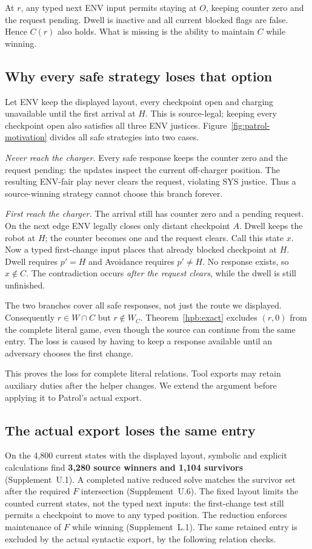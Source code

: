 At $r$, any typed next ENV input permits staying at $O$, keeping counter zero
and the request pending. Dwell is inactive and all current blocked flags are
false. Hence $C(r)$ also holds. What is missing is the ability to maintain
$C$ while winning.

\subsection{Why every safe strategy loses that option}
Let ENV keep the displayed layout, every checkpoint open and charging
unavailable until the first arrival at $H$. This is source-legal; keeping every checkpoint open also satisfies all
three ENV justices. Figure~\ref{fig:patrol-motivation} divides all safe
strategies into two cases.

\emph{Never reach the charger.} Every safe response keeps the counter zero
and the request pending: the updates inspect the current off-charger position.
The resulting ENV-fair play never clears the request, violating SYS justice.
Thus a source-winning strategy cannot choose this branch forever.

\emph{First reach the charger.} The arrival still has counter zero and a
pending request. On the next edge ENV legally closes only distant checkpoint
$A$. Dwell keeps the robot at $H$; the counter becomes one and the request
clears. Call this state $x$. Now a typed first-change input places that
already blocked checkpoint at $H$. Dwell requires $p'=H$ and Avoidance
requires $p'\ne H$. No response exists, so $x\notin C$.
The contradiction occurs \emph{after the request clears}, while the dwell
is still unfinished.

The two branches cover all safe responses, not just the route we displayed.
Consequently $r\in W\cap C$ but $r\notin W_C$. Theorem~\ref{hpb:exact}
excludes $(r,0)$ from the complete literal game, even though the source can
continue from the same entry. The loss is caused by having to keep a response
available until an adversary chooses the first change.

This proves the loss for complete literal relations. Tool exports may
retain auxiliary duties after the helper changes. We extend the argument
before applying it to Patrol's actual export.


\subsection{The actual export loses the same entry}
On the 4,800 current states with the displayed layout, symbolic and explicit
calculations find \textbf{3,280 source winners and 1,104 survivors}
(Supplement~U.1). A completed native reduced solve matches the survivor set
after the required $F$ intersection (Supplement~U.6). The fixed layout limits
the counted current states, not the typed next inputs: the first-change
test still permits a checkpoint to move to any typed position. The reduction enforces
maintenance of $F$ while winning (Supplement~L.1). The same retained entry
is excluded by the actual syntactic export, by the following relation checks.

